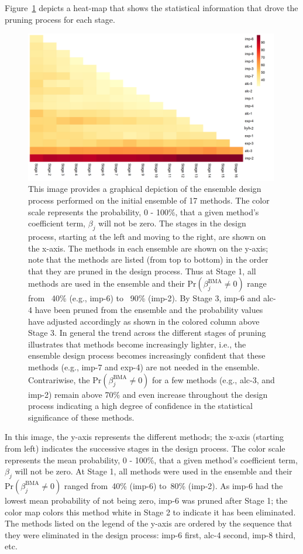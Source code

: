 \documentclass[journal=jpcbfk, manuscript=article]{achemso}
\newcommand{\+}[1]{\ensuremath{\mathbf{#1}}}
\begin{document}
Figure~\ref{Analysis:Figure3:P-not} depicts a heat-map that shows the statistical information that drove the pruning process for each stage.
\begin{figure}[h!]
	\centering
	\includegraphics[keepaspectratio,width=0.99\textwidth]{Figures/P_Not_Zero_Per_Stage}
	\caption{This image provides a graphical depiction of the ensemble design process performed on the initial ensemble of 17 methods.
	The color scale represents the probability, 0 - 100\%, that a given method's coefficient term, $\beta_j$ will not be zero.
	The stages in the design process, starting at the left and moving to the right, are shown on the x-axis.
	The methods in each ensemble are shown on the y-axis; note that the methods are listed (from top to bottom) in the order that they are pruned in the design process.
	Thus at Stage 1, all methods are used in the ensemble and their $\mathrm{Pr}(\beta_j^{\text{BMA}}\neq 0) $ range from ~40\% (e.g., imp-6) to ~90\% (imp-2).
	By Stage 3, imp-6 and alc-4 have been pruned from the ensemble and the probability values have adjusted accordingly as shown in the colored column above Stage 3.
	In general the trend across the different stages of pruning illustrates that methods become increasingly lighter, i.e., the ensemble design process becomes increasingly confident that these methods (e.g., imp-7 and exp-4) are not needed in the ensemble.
	Contrariwise, the $\mathrm{Pr}(\beta_j^{\text{BMA}}\neq 0) $ for a few methods (e.g., alc-3, and imp-2) remain above 70\% and even increase throughout the design process indicating a high degree of confidence in the statistical significance of these methods.}
	\label{Analysis:Figure3:P-not}
\end{figure}
In this image, the y-axis represents the different methods; the x-axis (starting from left) indicates the successive stages in the design process.
The color scale represents the mean probability, 0 - 100\%, that a given method's coefficient term, $\beta_j$ will not be zero.
At Stage 1, all methods were used in the ensemble and their $\mathrm{Pr}(\beta_j^{\text{BMA}}\neq 0)$ ranged from~40\% (imp-6) to~80\% (imp-2).
As imp-6 had the lowest mean probability of not being zero, imp-6 was pruned after Stage 1; the color map colors this method white in Stage 2 to indicate it has been eliminated.
The methods listed on the legend of the y-axis are  ordered by the sequence that they were eliminated in the design process: imp-6 first, alc-4 second, imp-8 third, etc.
\end{document}

